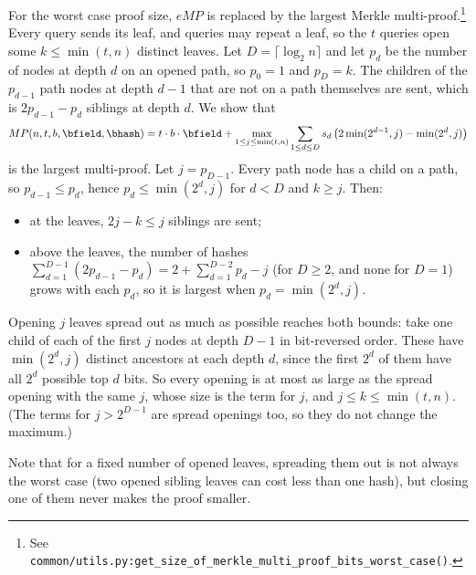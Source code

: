 For the worst case proof size, $eMP$ is replaced by the largest Merkle multi-proof.\footnote{See \texttt{common/utils.py:get\_size\_of\_merkle\_multi\_proof\_bits\_worst\_case()}.} Every query sends its leaf, and queries may repeat a leaf, so the $t$ queries open some $k \leq \min(t, n)$ distinct leaves. Let $D = \lceil \log_2 n \rceil$ and let $p_d$ be the number of nodes at depth $d$ on an opened path, so $p_0 = 1$ and $p_D = k$. The children of the $p_{d-1}$ path nodes at depth $d-1$ that are not on a path themselves are sent, which is $2p_{d-1} - p_d$ siblings at depth $d$. We show that
\begin{equation}
    MP(n,t, b,\bfield,\bhash) = t\cdot b\cdot \bfield + \max_{1 \leq j \leq \min(t, n)} \sum_{1\leq d\leq D} s_d \left(2\min(2^{d-1}, j) - \min(2^d, j)\right)
\end{equation}
is the largest multi-proof. Let $j = p_{D-1}$. Every path node has a child on a path, so $p_{d-1} \leq p_d$, hence $p_d \leq \min(2^d, j)$ for $d < D$ and $k \geq j$. Then:
\begin{itemize}
    \item at the leaves, $2j - k \leq j$ siblings are sent;
    \item above the leaves, the number of hashes $\sum_{d=1}^{D-1} (2p_{d-1} - p_d) = 2 + \sum_{d=1}^{D-2} p_d - j$ (for $D \geq 2$, and none for $D = 1$) grows with each $p_d$, so it is largest when $p_d = \min(2^d, j)$.
\end{itemize}
Opening $j$ leaves spread out as much as possible reaches both bounds: take one child of each of the first $j$ nodes at depth $D-1$ in bit-reversed order. These have $\min(2^d, j)$ distinct ancestors at each depth $d$, since the first $2^d$ of them have all $2^d$ possible top $d$ bits. So every opening is at most as large as the spread opening with the same $j$, whose size is the term for $j$, and $j \leq k \leq \min(t, n)$. (The terms for $j > 2^{D-1}$ are spread openings too, so they do not change the maximum.)

Note that for a fixed number of opened leaves, spreading them out is not always the worst case (two opened sibling leaves can cost less than one hash), but closing one of them never makes the proof smaller.
